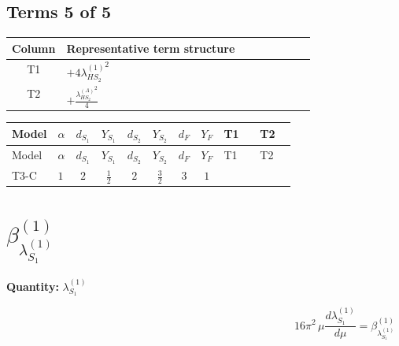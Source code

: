 \documentclass[8pt]{article}
\begin{document}
\begin{landscape}
\subsection*{Terms 5 of 5}
\begin{center}
\begin{tabular}{@{}c >{\raggedright\arraybackslash}p{0.82\linewidth}@{}}
\toprule
Column & Representative term structure \\
\midrule
T1 & \(\displaystyle +4 {\lambda_{HS_2}^{(1)}}^2\) \\
\midrule
T2 & \(\displaystyle +\frac{{\lambda_{HS_2}^{(A)}}^2}{4}\) \\
\midrule
\bottomrule
\end{tabular}
\end{center}
\smallskip
\tiny
\begin{longtable}{@{}llcccccc >{\raggedright\arraybackslash}p{0.21\linewidth} >{\raggedright\arraybackslash}p{0.21\linewidth}@{}}
\toprule
Model & $\alpha$ & $d_{S_1}$ & $Y_{S_1}$ & $d_{S_2}$ & $Y_{S_2}$ & $d_F$ & $Y_F$ & T1 & T2 \\
\midrule
\endfirsthead
\toprule
Model & $\alpha$ & $d_{S_1}$ & $Y_{S_1}$ & $d_{S_2}$ & $Y_{S_2}$ & $d_F$ & $Y_F$ & T1 & T2 \\
\midrule
\endhead
T3-C & $1$ & $2$ & $\frac{1}{2}$ & $2$ & $\frac{3}{2}$ & $3$ & $1$ & \scriptsize\adjustbox{max width=\linewidth}{$\begin{gathered} +4 {\lambda_{HS_2}^{(1)}}^2\end{gathered}$} & \scriptsize\adjustbox{max width=\linewidth}{$\begin{gathered} +\frac{{\lambda_{HS_2}^{(A)}}^2}{4}\end{gathered}$} \\
\midrule
\bottomrule
\end{longtable}
\clearpage
\section*{$\beta_{\lambda_{S_1}^{(1)}}^{(1)}$}
\noindent\textbf{Quantity: }$\lambda_{S_1}^{(1)}$\par\smallskip
\[16\pi^2\,\mu\frac{d \lambda_{S_1}^{(1)}}{d\mu}=\beta_{\lambda_{S_1}^{(1)}}^{(1)}\]

\end{landscape}
\end{document}
